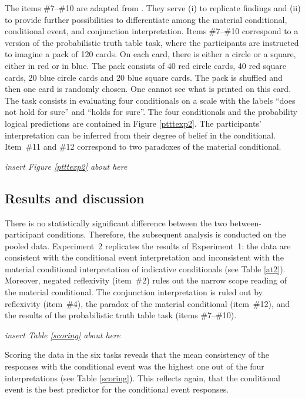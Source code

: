 \documentclass[11pt]{article}
\begin{document}
The items \#7--\#10 are adapted from . They serve
(i) to replicate findings and (ii) to provide further possibilities to
differentiate among the material conditional, conditional event, and
conjunction interpretation. Items \#7--\#10 correspond to a version of
the probabilistic truth table task, where the participants are
instructed to imagine a pack of 120 cards. On each card, there is
either a circle or a square, either in red or in blue. The pack
consists of 40 red circle cards, 40 red square cards, 20 blue circle
cards and 20 blue square cards. The pack is shuffled and then one card
is randomly chosen. One cannot see what is printed on this card. The
task consists in evaluating four conditionals on a scale with the
labels ``does not hold for sure'' and ``holds for sure''. The four
conditionals and the probability logical predictions are contained in
Figure \ref{ptttexp2}.  The participants' interpretation can be
inferred from their degree of belief in the conditional. Item~\#11
and \#12 correspond to two paradoxes of the material conditional.


\dotfill

\dotfill \emph{insert Figure
\ref{ptttexp2} about here} \dotfill

\dotfill




\subsection{Results and discussion}
There is no statistically significant difference between the two between-participant conditions. Therefore, the subsequent analysis is
conducted on the pooled data.  Experiment~2 replicates the results of
Experiment~1: the data are consistent with the conditional event
interpretation and inconsistent with the material conditional
interpretation of indicative conditionals (see Table
\ref{at2}). Moreover, negated reflexivity (item~\#2) rules out the
narrow scope reading of the material conditional. The conjunction
interpretation is ruled out by reflexivity (item~\#4), the paradox of
the material conditional (item~\#12), and the results of the
probabilistic truth table task (items \#7--\#10).


\dotfill

\dotfill \emph{insert Table
\ref{scoring} about here} \dotfill

\dotfill



Scoring the data in the six tasks reveals that the mean consistency of
the responses with the conditional event was the highest one out of
the four interpretations (see Table \ref{scoring}). This reflects
again, that the conditional event is the best predictor for the
conditional event responses.
\end{document}
